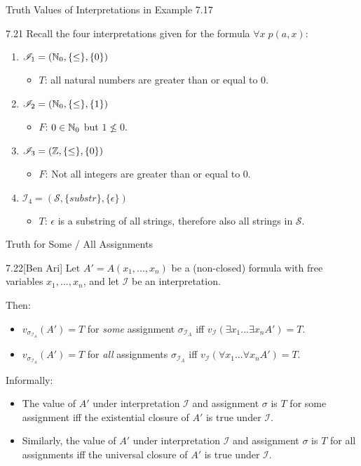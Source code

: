 \documentclass[style=sailor,size=12pt]{powerdot}
\begin{document}
\begin{wideslide}[bm=,toc=]{Truth Values of Interpretations in Example 7.17}
\begin{ex}{7.21}
Recall the four interpretations given for the formula $\forall x \; p(a,x)$:
\end{ex}
\vspace*{-2ex}
\begin{enumerate}
\item<2-> $\mathcal{I}_1 = (\mathbb{N}_0,\{\leq\},\{0\})$
\begin{itemize}
\item<3-> $T$: all natural numbers are greater than or equal to $0$.
\end{itemize}
\item<4-> $\mathcal{I}_2 = (\mathbb{N}_0,\{\leq\},\{1\})$
\begin{itemize}
\item<5-> $F$: $0 \in \mathbb{N}_0$ but $1 \not \leq 0$. 
\end{itemize}
\item<6-> $\mathcal{I}_3 = (\mathbb{Z},\{\leq\},\{0\})$
\begin{itemize}
\item<7-> $F$: Not all integers are greater than or equal to $0$.
\end{itemize}
\item<8-> $\mathcal{I}_4 = (\mathcal{S},\{substr\},\{ \epsilon \})$
\begin{itemize}
\item<9-> $T$: $\epsilon$ is a substring of all strings, therefore also all
strings in $\mathcal{S}$. 
\end{itemize}
\end{enumerate}
\end{wideslide}

\begin{wideslide}[bm=,toc=]{Truth for Some / All Assignments}
\begin{thm}{7.22}[Ben Ari]
Let $A' = A(x_1,...,x_n)$ be a (non-closed) formula with free variables
$x_1,...,x_n$, and let $\mathcal{I}$ be an interpretation. 
\end{thm}
\pause
Then:
\begin{itemize}
\item<3-> $v_{\sigma_{\mathcal{I}_A}}(A') = T$ for \emph{some} assignment $\sigma_{\mathcal{I}_A}$ iff $v_{\mathcal{I}}(\exists x_1 ... \exists x_n A') = T$.
\item<4-> $v_{\sigma_{\mathcal{I}_A}}(A') = T$ for \emph{all} assignments
$\sigma_{\mathcal{I}_A}$ iff $v_{\mathcal{I}}(\forall x_1 ... \forall x_n A') = T$.
\end{itemize}
\pause[3]
Informally:
\begin{itemize}
\item<6-> The value of $A'$ under interpretation $\mathcal{I}$ and assignment
$\sigma$ is $T$ for some assignment iff the existential closure of $A'$ is true 
under $\mathcal{I}$. 
\item<7-> Similarly, the value of $A'$ under interpretation $\mathcal{I}$ and assignment
$\sigma$ is $T$ for all assignments iff the universal closure of $A'$ is true 
under $\mathcal{I}$. 
\end{itemize}
\end{wideslide}
\end{document}
